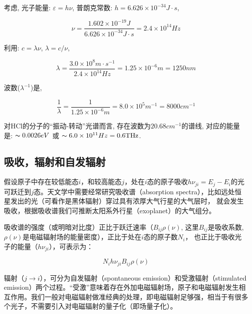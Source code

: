 考虑, 光子能量: $\varepsilon = h \nu$, 普朗克常数: $h=6.626 \times
10^{-34} J \cdot s$,

\begin{equation*}
\nu = \frac{1.602 \times 10^{-19} J}{6.626 \times 10^{-34} J \cdot
s}= 2.4 \times 10^{14} Hz
\end{equation*}

利用: $c=\lambda \nu$, $\lambda = c / \nu$,

\begin{equation*}
\lambda = \frac{3.0 \times 10^8 m \cdot s^{-1}}{2.4 \times 10^{14}
Hz}=1.25 \times 10^{-6}m = 1250 nm
\end{equation*}

波数($\lambda^{-1}$)是,

\begin{equation*}
\frac{1}{\lambda} = \frac{1}{1.25 \times 10^{-6}m}=8.0\times 10^5
m^{-1}=8000 cm^{-1}
\end{equation*}

对HCl的分子的``振动-转动''光谱而言, 存在波数为$20.68 cm^{-1}$的谱线,
对应的能量是: $\thicksim 0.0026 eV$ 或 $\thicksim 6.0 \times
10^{11}Hz = 0.6 \text{THz}$.


\subsection{吸收，辐射和自发辐射}

假设原子中存在较低能态$i$，和较高能态$j$，处在$i$态的原子吸收$h\nu_{ji}=E_j
- E_i$的光可跃迁到$j$态。天文学中需要经常研究吸收谱（absorption
spectra），比如远处恒星发出的光（可看作是黑体辐射）穿过具有浓厚大气行星的大气层时，
就会发生吸收，根据吸收谱我们可推断太阳系外行星（exoplanet）的大气组分。



吸收谱的强度（或明暗对比度）正比于跃迁速率（$B_{ij}\rho(\nu)$,
这里$B_{ij}$是吸收系数,
$\rho(\nu)$是电磁辐射场的能量密度），正比于处在$i$态的原子数$N_i$，
也正比于吸收光子的能量（$h \nu_{ji}$），可表示为：


\begin{equation}\label{Absorption}
    N_i h \nu_{ji} B_{ij} \rho(\nu)
\end{equation}


辐射（$j \to i$），可分为自发辐射（spontaneous
emission）和受激辐射（stimulated
emission）两个过程。“受激”意味着存在外加电磁辐射场，原子和电磁辐射发生相互作用。我们一般对电磁辐射做准经典的处理，即电磁辐射足够强，相当于有很多个光子，不需要引入对电磁辐射的量子化（即场量子化）。

